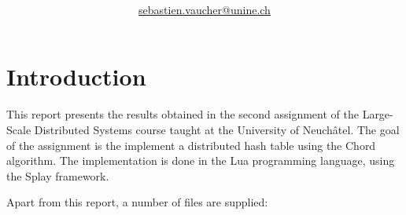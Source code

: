 \documentclass[11pt,a4paper,parskip=half]{scrartcl}
\author{\myauthor\\ \href{mailto:sebastien.vaucher@unine.ch}{sebastien.vaucher@unine.ch}}
\title{\huge \textbf{\mytitle}}
\begin{document}
\nocite{*}

\begin{titlingpage}

\begin{otherlanguage}{australian}
\maketitle
\end{otherlanguage}

\tableofcontents

\begin{table}[b]
\centering
{}
\qquad\qquad
{}
\end{table}

\end{titlingpage}

\pagebreak

\section{Introduction}

This report presents the results obtained in the second assignment of the Large-Scale Distributed Systems course taught at the University of Neuchâtel.
The goal of the assignment is the implement a distributed hash table using the Chord algorithm.
The implementation is done in the Lua programming language, using the Splay framework.

Apart from this report, a number of files are supplied:
\end{document}
